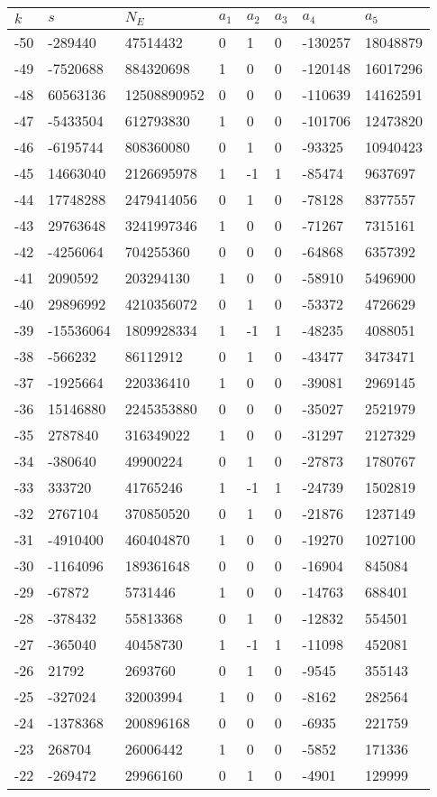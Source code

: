 \documentclass{amsart}
\begin{document}
\begin{longtable}{|l|l|l|lllll|}
\hline
$k$ & $s$ & $N_E$ & $a_1$ & $a_2$ & $a_3$ & $a_4$ & $a_5$\\
\hline
-50&-289440&47514432&0&1&0&-130257&18048879\\
-49&-7520688&884320698&1&0&0&-120148&16017296\\
-48&60563136&12508890952&0&0&0&-110639&14162591\\
-47&-5433504&612793830&1&0&0&-101706&12473820\\
-46&-6195744&808360080&0&1&0&-93325&10940423\\
-45&14663040&2126695978&1&-1&1&-85474&9637697\\
-44&17748288&2479414056&0&1&0&-78128&8377557\\
-43&29763648&3241997346&1&0&0&-71267&7315161\\
-42&-4256064&704255360&0&0&0&-64868&6357392\\
-41&2090592&203294130&1&0&0&-58910&5496900\\
-40&29896992&4210356072&0&1&0&-53372&4726629\\
-39&-15536064&1809928334&1&-1&1&-48235&4088051\\
-38&-566232&86112912&0&1&0&-43477&3473471\\
-37&-1925664&220336410&1&0&0&-39081&2969145\\
-36&15146880&2245353880&0&0&0&-35027&2521979\\
-35&2787840&316349022&1&0&0&-31297&2127329\\
-34&-380640&49900224&0&1&0&-27873&1780767\\
-33&333720&41765246&1&-1&1&-24739&1502819\\
-32&2767104&370850520&0&1&0&-21876&1237149\\
-31&-4910400&460404870&1&0&0&-19270&1027100\\
-30&-1164096&189361648&0&0&0&-16904&845084\\
-29&-67872&5731446&1&0&0&-14763&688401\\
-28&-378432&55813368&0&1&0&-12832&554501\\
-27&-365040&40458730&1&-1&1&-11098&452081\\
-26&21792&2693760&0&1&0&-9545&355143\\
-25&-327024&32003994&1&0&0&-8162&282564\\
-24&-1378368&200896168&0&0&0&-6935&221759\\
-23&268704&26006442&1&0&0&-5852&171336\\
-22&-269472&29966160&0&1&0&-4901&129999\\

\end{longtable}
\end{document}
